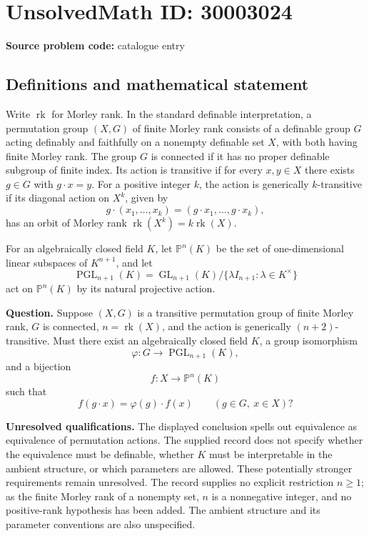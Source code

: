\documentclass[11pt]{article}
\begin{document}
\section*{UnsolvedMath ID: 30003024}
\textbf{Source problem code:} catalogue entry
\subsection{Definitions and mathematical statement}
Write \(\operatorname{rk}\) for Morley rank. In the standard definable interpretation, a permutation group \((X,G)\) of finite Morley rank consists of a definable group \(G\) acting definably and faithfully on a nonempty definable set \(X\), with both having finite Morley rank. The group \(G\) is connected if it has no proper definable subgroup of finite index. Its action is transitive if for every \(x,y\in X\) there exists \(g\in G\) with \(g\cdot x=y\). For a positive integer \(k\), the action is generically \(k\)-transitive if its diagonal action on \(X^k\), given by
\[
g\cdot(x_1,\ldots,x_k)=(g\cdot x_1,\ldots,g\cdot x_k),
\]
has an orbit of Morley rank \(\operatorname{rk}(X^k)=k\operatorname{rk}(X)\).

For an algebraically closed field \(K\), let \(\mathbb P^n(K)\) be the set of one-dimensional linear subspaces of \(K^{n+1}\), and let
\[
\operatorname{PGL}_{n+1}(K)=\operatorname{GL}_{n+1}(K)/\{\lambda I_{n+1}:\lambda\in K^\times\}
\]
act on \(\mathbb P^n(K)\) by its natural projective action.

\textbf{Question.} Suppose \((X,G)\) is a transitive permutation group of finite Morley rank, \(G\) is connected, \(n=\operatorname{rk}(X)\), and the action is generically \((n+2)\)-transitive. Must there exist an algebraically closed field \(K\), a group isomorphism
\[
\varphi:G\longrightarrow\operatorname{PGL}_{n+1}(K),
\]
and a bijection
\[
f:X\longrightarrow\mathbb P^n(K)
\]
such that
\[
f(g\cdot x)=\varphi(g)\cdot f(x)
\qquad(g\in G,\ x\in X)?
\]

\textbf{Unresolved qualifications.} The displayed conclusion spells out equivalence as equivalence of permutation actions. The supplied record does not specify whether the equivalence must be definable, whether \(K\) must be interpretable in the ambient structure, or which parameters are allowed. These potentially stronger requirements remain unresolved. The record supplies no explicit restriction \(n\geq1\); as the finite Morley rank of a nonempty set, \(n\) is a nonnegative integer, and no positive-rank hypothesis has been added. The ambient structure and its parameter conventions are also unspecified.
\end{document}
